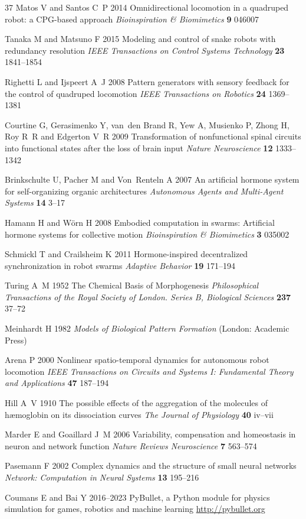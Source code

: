 \documentclass{iopjournal}
\begin{document}
\begin{thebibliography}{37}
Matos V and Santos C~P 2014 Omnidirectional locomotion in a quadruped robot: a CPG-based approach {\em Bioinspiration \& Biomimetics\/} {\bf 9} 046007

Tanaka M and Matsuno F 2015 Modeling and control of snake robots with redundancy resolution {\em IEEE Transactions on Control Systems Technology\/} {\bf 23} 1841--1854

Righetti L and Ijspeert A~J 2008 Pattern generators with sensory feedback for the control of quadruped locomotion {\em IEEE Transactions on Robotics\/} {\bf 24} 1369--1381

Courtine G, Gerasimenko Y, van~den Brand R, Yew A, Musienko P, Zhong H, Roy R~R and Edgerton V~R 2009 Transformation of nonfunctional spinal circuits into functional states after the loss of brain input {\em Nature Neuroscience\/} {\bf 12} 1333--1342

Brinkschulte U, Pacher M and Von~Renteln A 2007 An artificial hormone system for self-organizing organic architectures {\em Autonomous Agents and Multi-Agent Systems\/} {\bf 14} 3--17

Hamann H and W{\"o}rn H 2008 Embodied computation in swarms: Artificial hormone systems for collective motion {\em Bioinspiration \& Biomimetics\/} {\bf 3} 035002

Schmickl T and Crailsheim K 2011 Hormone-inspired decentralized synchronization in robot swarms {\em Adaptive Behavior\/} {\bf 19} 171--194

Turing A~M 1952 The Chemical Basis of Morphogenesis {\em Philosophical Transactions of the Royal Society of London. Series B, Biological Sciences\/} {\bf 237} 37--72

Meinhardt H 1982 {\em Models of Biological Pattern Formation\/} (London: Academic Press)

Arena P 2000 Nonlinear spatio-temporal dynamics for autonomous robot locomotion {\em IEEE Transactions on Circuits and Systems I: Fundamental Theory and Applications\/} {\bf 47} 187--194

Hill A~V 1910 The possible effects of the aggregation of the molecules of h{\ae}moglobin on its dissociation curves {\em The Journal of Physiology\/} {\bf 40} iv--vii

Marder E and Goaillard J~M 2006 Variability, compensation and homeostasis in neuron and network function {\em Nature Reviews Neuroscience\/} {\bf 7} 563--574

Pasemann F 2002 Complex dynamics and the structure of small neural networks {\em Network: Computation in Neural Systems\/} {\bf 13} 195--216

Coumans E and Bai Y 2016--2023 PyBullet, a Python module for physics simulation for games, robotics and machine learning \url{http://pybullet.org}

\end{thebibliography}
\end{document}
